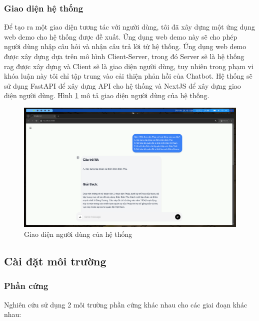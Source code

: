 \subsubsection{Giao diện hệ thống}
\label{subsubsection:system_ui}
Để tạo ra một giao diện tương tác với người dùng, tôi đã xây dựng một ứng dụng web demo cho hệ thống được đề xuất. Ứng dụng web demo này sẽ cho phép người dùng nhập câu hỏi và nhận câu trả lời từ hệ thống. Ứng dụng web demo được xây dựng dựa trên mô hình Client-Server, trong đó Server sẽ là hệ thống \gls{rag} được xây dựng và Client sẽ là giao diện người dùng, tuy nhiên trong phạm vi khóa luận này tôi chỉ tập trung vào cải thiện phản hồi của Chatbot. Hệ thống sẽ sử dụng FastAPI để xây dựng API cho hệ thống và NextJS để xây dựng giao diện người dùng. Hình \ref{fig:system_ui} mô tả giao diện người dùng của hệ thống.
\begin{figure}
    \centering
    \includegraphics[width=1\textwidth, trim=150 50 150 200, clip]{Chapter4/Fig/system_ui.png}
    \caption{Giao diện người dùng của hệ thống}
    \label{fig:system_ui}
\end{figure}
\subsection{Cài đặt môi trường}
\subsubsection{Phần cứng}
Nghiên cứu sử dụng 2 môi trường phần cứng khác nhau cho các giai đoạn khác nhau:


